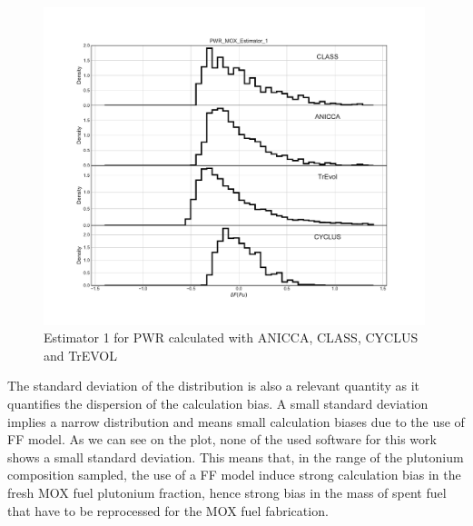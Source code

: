 \begin{figure}[h]
	\begin{center}
		\includegraphics[width = 0.99\textwidth]{../../Feature_1/RAW_DATA/FIG/PWR_MOX_Estimator_1.pdf}
		\caption{Estimator 1 for PWR calculated with ANICCA, CLASS, CYCLUS and TrEVOL}
		\label{fig:Est1_PWR}
	\end{center}
\end{figure}

The standard deviation of the distribution is also a relevant quantity as it quantifies the dispersion of the calculation bias. A small standard deviation implies a narrow distribution and means small calculation biases due to the use of FF model. As we can see on the plot, none of the used software for this work shows a small standard deviation. This means that, in the range of the plutonium composition sampled, the use of a FF model induce strong calculation bias in the fresh MOX fuel plutonium fraction, hence strong bias in the mass of spent fuel that have to be reprocessed for the MOX fuel fabrication.

